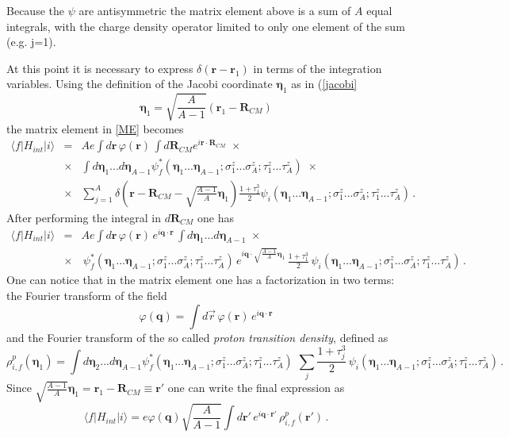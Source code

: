 Because the $\psi$ are antisymmetric the matrix element above is a sum of $A$ equal integrals, with the charge density operator 
limited to only one element of the sum (e.g. j=1). 

At this point it is necessary to express 
$\delta(\mathbf{r}-\mathbf{r}_1)$ in terms of the integration variables. Using the definition of the Jacobi coordinate $\mathbf{\eta}_1$  
as in (\ref{jacobi}
\begin{equation}
\mathbf{\eta}_1=\sqrt{\frac{A}{A-1}}(\mathbf{r}_1 - \mathbf{R}_{CM})
\end{equation}
the matrix element in \ref{ME} becomes
\begin{eqnarray}\label{MEE} 
 \langle f|H_{int}|i\rangle &=& A e \int d\mathbf{r} \,\varphi(\mathbf{r})\,\int d\mathbf{R}_{CM}  e^{i\mathbf{r}\cdot\mathbf{R}_{CM}}
  \,\,\times \nonumber\\
 &\times& \int d\mathbf{\eta}_1...d\mathbf{\eta}_{A-1}\psi^*_f(\mathbf{\eta}_1...\mathbf{\eta}_{A-1}; 
 \sigma_1^z...\sigma_A^z;\tau_1^z...\tau_A^z)\,\,\times \nonumber\\
 &\times&\sum_{j=1}^A  \delta\left(\mathbf{r}-\mathbf{R}_{CM}-\sqrt{\frac{A-1}{A}} 
 \mathbf{\eta}_1\right)\frac{1+\tau_1^3}{2} \psi_i(\mathbf{\eta}_1...\mathbf{\eta}_{A-1}; 
 \sigma_1^z...\sigma_A^z;\tau_1^z...\tau_A^z)\,.
\end{eqnarray}
After performing the integral in $d\mathbf{R}_{CM}$ one has
\begin{eqnarray}   
 \langle f|H_{int}|i\rangle &=& A e \int d\mathbf{r} \,\varphi(\mathbf{r})\,e^{i\mathbf{q}\cdot\mathbf{r}}\,\int d\mathbf{\eta}_1...d\mathbf{\eta}_{A-1} 
  \,\,\times \nonumber\\
&\times&\, \psi^*_f(\mathbf{\eta}_1...\mathbf{\eta}_{A-1}; \sigma_1^z...\sigma_A^z;\tau_1^z...\tau_A^z)\,
e^{i\mathbf{q}\cdot\sqrt{\frac{A-1}{A}}\mathbf{\eta}_1}\,\frac{1+\tau_1^3}{2} \,\psi_i(\mathbf{\eta}_1...\mathbf{\eta}_{A-1}; 
 \sigma_1^z...\sigma_A^z;\tau_1^z...\tau_A^z)\,.
\end{eqnarray}
One can notice that in the matrix element one has a factorization in two terms: the Fourier transform of the field 
\begin{equation}
 \varphi(\mathbf{q})=\int d\vec r \,\varphi(\mathbf{r})\,e^{i\mathbf{q}\cdot\mathbf{r}}
\end{equation}
and the Fourier transform of the so called {\it proton transition density}, defined as
\begin{equation}
 \rho_{i,f}^p(\mathbf{\eta}_1) =\int d\mathbf{\eta}_2...d\mathbf{\eta}_{A-1} 
 \psi^*_f(\mathbf{\eta}_1...\mathbf{\eta}_{A-1}; \sigma_1^z...\sigma_A^z;\tau_1^z...\tau_A^z)\,
\,\sum_j\frac{1+\tau_j^3}{2} \,\psi_i(\mathbf{\eta}_1...\mathbf{\eta}_{A-1}; 
 \sigma_1^z...\sigma_A^z;\tau_1^z...\tau_A^z)\,.
\end{equation}
Since $\sqrt{\frac{A-1}{A}}\mathbf{\eta}_1=\mathbf{r}_1-\mathbf{R}_{CM}\equiv \mathbf{r}'$ one can write  the final expression as
\begin{equation}
\langle f|H_{int}|i\rangle =  e \varphi(\mathbf{q}) \sqrt{\frac{A}{A-1}}\int d\mathbf{r}' \,e^{i\mathbf{q}\cdot\mathbf{r}'}\, \rho^p_{i,f}(\mathbf{r}')\,.
\end{equation}

